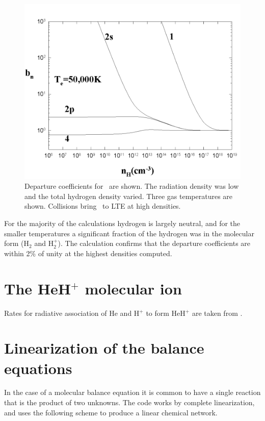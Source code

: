 \begin{figure}
\centering
\includegraphics[scale=0.8]{Hmi_vs_density}
\caption[\hminus\ departure coefficients vs density]{Departure coefficients for \hminus\ are shown. The radiation density
was low and the total hydrogen density varied.  Three gas temperatures are
shown.  Collisions bring \hminus\ to LTE at high densities.}
\label{fig:Hmi_vs_density}
\end{figure}

For the majority of the calculations hydrogen is largely neutral, and
for the smaller temperatures a significant fraction of the hydrogen was
in the molecular form (H$_2$ and H$_2^+$).  The calculation confirms that the
departure coefficients are within 2\% of unity at the highest densities
computed.

\section{The HeH$^+$ molecular ion }

Rates for radiative association of He and H$^+$ to form HeH$^+$ are taken from \citet{Zygelman1990}.

\section{Linearization of the balance equations}

In the case of a molecular balance equation it is common to have a single
reaction that is the product of two unknowns.  The code works by complete
linearization, and uses the following scheme to produce a linear chemical
network.

